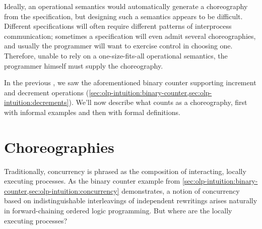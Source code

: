 \documentclass[
  class=../hdeyoung-proposal,
  crop=false
]{standalone}
\begin{document}
Ideally, an operational semantics would automatically generate a choreography from the specification, but designing such a semantics appears to be difficult.
Different specifications will often require different patterns of interprocess communication;
sometimes a specification will even admit several choreographies, and usually the programmer will want to exercise control in choosing one.
Therefore, unable to rely on a one-size-fits-all operational semantics, the programmer himself must supply the choreography.

In the previous , we saw the aforementioned binary counter supporting increment and decrement operations (\cref{sec:olp-intuition:binary-counter,sec:olp-intuition:decrements}).
We'll now describe what counts as a choreography, first with informal examples and then with formal definitions.






\section{Choreographies}\label{sec:choreographies}

Traditionally, concurrency is phrased as the composition of interacting, locally executing processes.
As the binary counter example from \cref{sec:olp-intuition:binary-counter,sec:olp-intuition:concurrency} demonstrates, a notion of concurrency based on indistinguishable interleavings of independent rewritings arises naturally in forward-chaining ordered logic programming.
But where are the locally executing processes?
\end{document}
